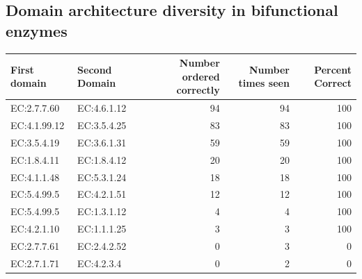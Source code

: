 \subsection*{Domain architecture diversity in bifunctional enzymes}
\begin{table}[htbp]
  \begin{tabular}{|l|l|r|r|r|}
  \hline
  First domain & Second Domain & Number ordered correctly & Number times seen & Percent Correct \\
  \hline
  EC:2.7.7.60  & EC:4.6.1.12   & 94                                           & 94                                       & 100                                 \\
  \hline
  EC:4.1.99.12 & EC:3.5.4.25   & 83                                           & 83                                       & 100                                 \\
  \hline
  EC:3.5.4.19  & EC:3.6.1.31   & 59                                           & 59                                       & 100                                 \\
  \hline
  EC:1.8.4.11  & EC:1.8.4.12   & 20                                           & 20                                       & 100                                 \\
  \hline
  EC:4.1.1.48  & EC:5.3.1.24   & 18                                           & 18                                       & 100                                 \\
  \hline
  EC:5.4.99.5  & EC:4.2.1.51   & 12                                           & 12                                       & 100                                 \\
  \hline
  EC:5.4.99.5  & EC:1.3.1.12   & 4                                            & 4                                        & 100                                 \\
  \hline
  EC:4.2.1.10  & EC:1.1.1.25   & 3                                            & 3                                        & 100                                 \\
  \hline
  EC:2.7.7.61  & EC:2.4.2.52   & 0                                            & 3                                        & 0                                   \\
  \hline
  EC:2.7.1.71  & EC:4.2.3.4    & 0                                            & 2                                        & 0                                   \\

\end{tabular}
\end{table}
